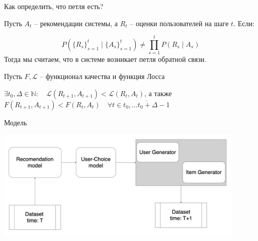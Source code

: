 \documentclass{beamer}
\begin{document}
\begin{frame}{Как определить, что петля есть?}

  \vspace{0.3em}
  
  Пусть $A_t$ – рекомендации системы, а $R_t$ – оценки пользователей на шаге $t$. Если:

  \[
      P(\{ R_s \}_{s=1}^t \mid \{ A_s \}_{s=1}^t) \neq \prod_{s=1}^t P(R_s \mid A_s)
  \]
  Тогда мы считаем, что в системе возникает петля обратной связи. 
  
  \vspace{1em} %

  \vspace{0.3em}
  
  Пусть $F, \mathcal{L}$ – функционал качества и функция Лосса
  
  $\exists t_0, \Delta \in \mathbb{N}: \quad \mathcal{L}(R_{t+1}, A_{t+1}) < \mathcal{L}(R_t, A_t)$, а также  $F(R_{t+1}, A_{t+1}) < F(R_t, A_t) \quad   \forall t \in \overline{t_0, \ldots t_0 + \Delta - 1}$

\end{frame}

\begin{frame}{Модель}
    \begin{itemize}
         \includegraphics[width=0.9\textwidth]{model.png}
    \end{itemize}
\end{frame}
\end{document}
